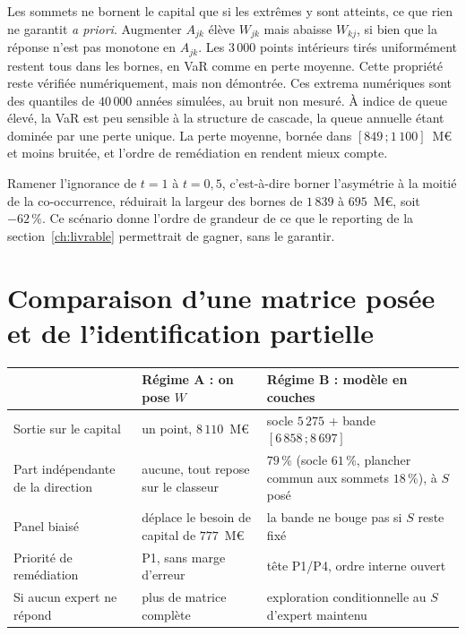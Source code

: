 Les sommets ne bornent le capital que si les extrêmes y sont atteints, ce que rien ne garantit
\emph{a priori}. Augmenter $A_{jk}$ élève $W_{jk}$ mais abaisse $W_{kj}$, si bien que la
réponse n'est pas monotone en $A_{jk}$. Les $3\,000$ points intérieurs tirés uniformément restent tous
dans les bornes, en VaR comme en perte moyenne. Cette propriété reste vérifiée
numériquement, mais non démontrée. Ces extrema numériques sont des quantiles de $40\,000$ années
simulées, au bruit non mesuré. À indice de queue élevé, la VaR est peu sensible à la structure de
cascade, la queue annuelle étant dominée par une perte unique. La perte moyenne, bornée
dans $[849\,;1\,100]$~M\euro{} et moins bruitée, et l'ordre de remédiation en rendent mieux compte.

Ramener l'ignorance de $t=1$ à $t=0{,}5$, c'est-à-dire borner l'asymétrie à la moitié de la
co-occurrence, réduirait la largeur des bornes de $1\,839$ à $695$~M\euro{}, soit $-62\,\%$. Ce scénario donne l'ordre de grandeur de ce que le reporting de la section~\ref{ch:livrable} permettrait de gagner, sans le garantir.


\section{Comparaison d'une matrice posée et de l'identification partielle}

\begin{center}\footnotesize
\renewcommand{\arraystretch}{1.3}
\begin{tabular}{@{}p{4.1cm} p{4.5cm} p{5.6cm}@{}}
\toprule
 & \textbf{Régime A : on pose $W$} & \textbf{Régime B : modèle en couches} \\
\midrule
Sortie sur le capital & un point, $8\,110$~M\euro{} & socle $5\,275$ + bande $[6\,858\,;8\,697]$ \\
Part indépendante de la direction & aucune, tout repose sur le classeur & $79\,\%$ (socle $61\,\%$, plancher commun aux sommets $18\,\%$), à $S$ posé \\
Panel biaisé & déplace le besoin de capital de $777$~M\euro{} & la bande ne bouge pas si $S$ reste fixé \\
Priorité de remédiation & P1, sans marge d'erreur & tête P1/P4, ordre interne ouvert \\
Si aucun expert ne répond & plus de matrice complète & exploration conditionnelle au $S$ d'expert maintenu \\
\bottomrule
\end{tabular}
\end{center}

